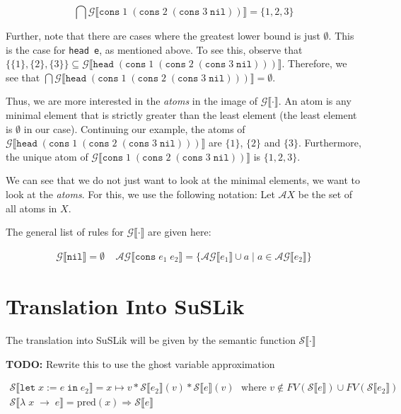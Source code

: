 \documentclass[10pt]{article}
\newcommand{\ttt}[1]{\texttt{#1}}
\newcommand{\ra}{\ensuremath{\rightarrow}}
\newcommand{\Ra}{\ensuremath{\Rightarrow}}
\newcommand{\head}{\ttt{head}}
\newcommand{\cons}{\ttt{cons}}
\newcommand{\nil}{\ttt{nil}}
\newcommand{\letbnd}{\ttt{let}}
\newcommand{\inexpr}{\ttt{in}}
\newcommand{\sem} [1] {\llbracket#1\rrbracket}
\newcommand{\Gsem} [1] {\mathcal{G}\sem{#1}}
\newcommand{\Ssem} [1] {\mathcal{S}\sem{#1}}
\newcommand{\Atoms} {\mathcal{A}}
\begin{document}
\[
  \bigcap\Gsem{\cons\; 1\; (\cons\; 2\; (\cons\; 3\; \nil))} = \{1, 2, 3\}
\]

Further, note that there are cases where the greatest lower bound is just $\emptyset$. This is the case for \verb|head e|, as mentioned
above. To see this, observe that $\{\{1\},\{2\},\{3\}\} \subseteq \Gsem{\head\; (\cons\; 1\; (\cons\; 2\; (\cons\; 3\; \nil)))}$. Therefore,
we see that $\bigcap{\Gsem{\head\; (\cons\; 1\; (\cons\; 2\; (\cons\; 3\; \nil)))}} = \emptyset$.

Thus, we are more interested in the \textit{atoms} in the image of $\Gsem{\cdot}$. An atom is any minimal element that is
strictly greater than the least element (the least element is $\emptyset$ in our case). Continuing our example, the atoms of $\Gsem{\head\; (\cons\; 1\; (\cons\; 2\; (\cons\; 3\; \nil)))}$ are $\{1\}$, $\{2\}$ and $\{3\}$. Furthermore, the unique atom of $\Gsem{\cons\; 1\; (\cons\; 2\; (\cons\; 3\; \nil))}$ is $\{1,2,3\}$.

We can see that we do not just want to look at the minimal elements, we want to look at the \textit{atoms}. For this, we use the
following notation: Let $\Atoms X$ be the set of all atoms in $X$.

\noindent
The general list of rules for $\Gsem{\cdot}$ are given here:

\[
  \begin{array}{cc}
    \Gsem{\nil} = \emptyset
    ~~~~~
    \Atoms\Gsem{\cons\; e_1\; e_2} = \{ \Atoms\Gsem{e_1} \cup a\; |\; a \in \Atoms\Gsem{e_2} \}
  \end{array}
\]


\section{Translation Into SuSLik}


\noindent
The translation into SuSLik will be given by the semantic function $\Ssem{\cdot}$

\noindent
\textbf{TODO:} Rewrite this to use the ghost variable approximation

\[
  \begin{array}{cc}
    \Ssem{\letbnd\; x\; \ttt{:=}\; e\; \inexpr\; e_2} = x \mapsto v * \Ssem{e_2}(v) * \Ssem{e}(v)~~~\text{where $v \notin FV(\Ssem{e}) \cup FV(\Ssem{e_2})$}
    \\
    \Ssem{\lambda\; x\; \ra\; e} = \text{pred}(x) \Ra \Ssem{e}
  \end{array}
\]
\end{document}
